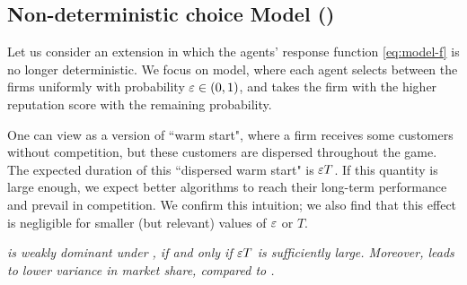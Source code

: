 \documentclass[../competing_bandits.tex]{subfiles}
\begin{document}
\subsection{Non-deterministic choice Model (\HardMaxRandom)}\label{sec:non_greedy}

Let us consider an extension in which the agents' response function \eqref{eq:model-f} is no longer deterministic. We focus on \HardMaxRandom model, where each agent selects between the firms uniformly with probability $\varepsilon\in (0,1)$, and takes the firm with the higher reputation score with the remaining probability.

One can view \HardMaxRandom as a version of ``warm start", where a firm receives some customers without competition, but these customers are dispersed throughout the game. The expected duration of this ``dispersed warm start" is $\varepsilon T$. If this quantity is large enough, we expect better algorithms to reach their long-term performance and prevail in competition. We confirm this intuition; we also find that this effect is negligible for smaller (but relevant) values of $\varepsilon$ or $T$.


\begin{finding}\label{find:non_greedy_choice}
\textit{\TS is weakly dominant under \HardMaxRandom, if and only if $\varepsilon T$ is sufficiently large. Moreover, \HardMaxRandom leads to lower variance in market share, compared to \HardMax.}
\end{finding}
\end{document}
